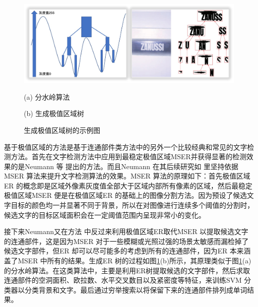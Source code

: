     \begin{figure}[!h]
    \centering
    \includegraphics[width=\textwidth]{./figures/c2_er_tree.jpg}
    \begin{minipage}[t]{0.48\linewidth}
    \centerline{ \small (a) 分水岭算法}
    \end{minipage}
    \begin{minipage}[t]{0.48\linewidth}
    \centerline{ \small (b) 生成极值区域树}
    \end{minipage}
    \caption{生成极值区域树的示例图}
    \label{fig.c2_er_tree}
    \end{figure}

    基于极值区域的方法是基于连通部件类方法中的另外一个比较经典和常见的文字检测方法。首先在文字检测方法中应用到最稳定极值区域MSER并获得显著的检测效果的是Neumann 等\cite{Neumann2010A} 提出的方法。而且Neumann 在其后续研究如\cite{Neumann2011Text} 里坚持依据MSER 算法来提升文字检测算法的效果。MSER 算法的原理如下：首先极值区域ER 的概念即是区域外像素灰度值全部大于区域内部所有像素的区域，然后最稳定极值区域MSER 便是在极值区域ER 的基础上的图像分割方法。因为预设了候选文字目标的颜色均一并显著不同于背景，所以在对图像进行连续多个阈值的分割时，候选文字的目标区域面积会在一定阈值范围内呈现非常小的变化。

    接下来Neumann又在方法\cite{Neumann2012Real} 中反过来利用极值区域ER取代MSER 以提取候选文字的连通部件，这是因为MSER 对于一些模糊或光照过强的场景太敏感而漏检掉了候选文字部件，但ER 却可以尽可能多的考虑到所有的连通部件，因为ER 本来涵盖了MSER 中所有的结果。生成ER 树的过程如图\ref{fig.c2_er_tree}(b)所示，其原理类似于图\ref{fig.c2_er_tree}(a)的分水岭算法。在这类算法中，主要是利用ER树提取候选的文字部件，然后求取连通部件的空洞面积、欧拉数、水平交叉数目以及紧密度等特征，来训练SVM 分类器以分类背景和文字。最后通过穷举搜索以将保留下来的连通部件排列成单词结果。

